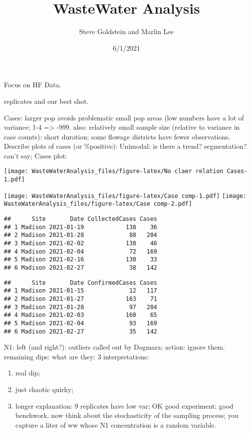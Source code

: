 \documentclass[
]{article}
\title{WasteWater Analysis}
\author{Steve Goldstein and Marlin Lee}
\date{6/1/2021}
\begin{document}
\maketitle

Focus on HF Data.

replicates and our best shot.

Cases: larger pop avoids problematic small pop areas (low numbers have a
lot of variance; 1-4 =\textgreater{} -999. also: relatively small sample
size (relative to variance in case counts): short duration; some flowage
districts have fewer observations. Describe plots of cases (or
\%positive): Unimodal: is there a trend? segmentation? can't say; Cases
plot:

\texttt{[image: WasteWaterAnalysis\_files/figure-latex/No claer relation Cases-1.pdf]}

\texttt{[image: WasteWaterAnalysis\_files/figure-latex/Case comp-1.pdf]}
\texttt{[image: WasteWaterAnalysis\_files/figure-latex/Case comp-2.pdf]}

\begin{verbatim}
##      Site       Date CollectedCases Cases
## 1 Madison 2021-01-19            138    36
## 2 Madison 2021-01-28             88   204
## 3 Madison 2021-02-02            138    46
## 4 Madison 2021-02-04             72   169
## 5 Madison 2021-02-16            130    33
## 6 Madison 2021-02-27             38   142
\end{verbatim}

\begin{verbatim}
##      Site       Date ConfirmedCases Cases
## 1 Madison 2021-01-15             12   117
## 2 Madison 2021-01-27            163    71
## 3 Madison 2021-01-28             97   204
## 4 Madison 2021-02-03            160    65
## 5 Madison 2021-02-04             93   169
## 6 Madison 2021-02-27             35   142
\end{verbatim}

N1: left (and right?): outliers called out by Dagmara; action: ignore
them. remaining dips: what are they: 3 interpretations:

\begin{enumerate}
\def\labelenumi{(\alph{enumi})}
\item
  real dip;
\item
  just chaotic quirky;
\item
  longer explanation: 9 replicates have low var; OK good experiment;
  good benchwork. now think about the stochasticity of the sampling
  process; you capture a liter of ww whose N1 concentration is a random
  variable.
\end{enumerate}
\end{document}
